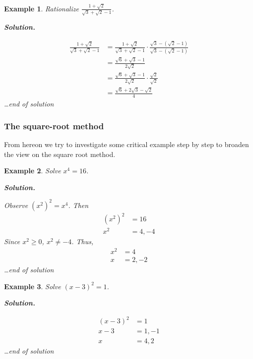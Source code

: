 \documentclass[12pt]{article}
\newtheorem*{example}{Example}
\newenvironment{solution}{\textbf{Solution.} \par}{\hfill \textit{\dots end of solution}}
\begin{document}
    \begin{example}
        Rationalize $\frac{1+\sqrt{2}}{\sqrt{3}+\sqrt{2}-1}$.

        \begin{solution}
            \begin{align*}
                \frac{1+\sqrt{2}}{\sqrt{3}+\sqrt{2}-1}&=\frac{1+\sqrt{2}}{\sqrt{3}+\sqrt{2}-1}\cdot \frac{\sqrt{3}-(\sqrt{2}-1)}{\sqrt{3}-(\sqrt{2}-1)}\\
                &=\frac{\sqrt{6}+\sqrt{3}-1}{2\sqrt{2}}\\
                &=\frac{\sqrt{6}+\sqrt{3}-1}{2\sqrt{2}}\cdot \frac{\sqrt{2}}{\sqrt{2}}\\
                &=\frac{\sqrt{6}+2\sqrt{3}-\sqrt{2}}{4}
            \end{align*}
        \end{solution}
    \end{example}
    \subsubsection*{The square-root method}

    From hereon we try to investigate some critical example step by step to broaden the view on the square root method.

    \begin{example}
        Solve $x^4=16$.

        \begin{solution}
            Observe $(x^2)^2=x^4$. Then \begin{align*}
                (x^2)^2&=16\\
                x^2&=4,-4
            \end{align*}
            Since $x^2\geq 0$, $x^2\neq -4$. Thus,\begin{align*}
                x^2&=4\\
                x&=2,-2
            \end{align*}
        \end{solution}
    \end{example}

    \begin{example}
        Solve $(x-3)^2=1$.

        \begin{solution}
            \begin{align*}
                (x-3)^2&=1\\
                x-3&=1, -1\\
                x&=4, 2
            \end{align*}
        \end{solution}
    \end{example}
\end{document}
